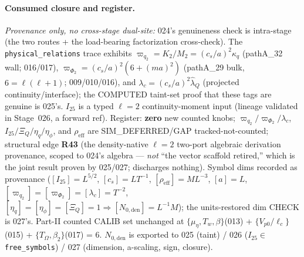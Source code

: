 \paragraph{Consumed closure and register.}
\emph{Provenance only, no cross-stage dual-site:} 024's genuineness check is intra-stage (the two
routes + the load-bearing factorization cross-check). The \texttt{physical\_relations} trace
exhibits \(\varpi_{q_2}=K_2/M_2=(c_s/a)^2\kappa_q\) (pathA\_32 wall; 016/017), \(\varpi_{\Phi_2}=(c_s/a)^2(6+(ma)^2)\)
(pathA\_29 bulk, \(6=\ell(\ell+1)\); 009/010/016), and \(\lambda_c=(c_s/a)^2\hat\lambda_Q\) (projected
continuity/interface); the COMPUTED taint-set proof that these tags are genuine is 025's. \(I_{25}\)
is a typed \(\ell=2\) continuity-moment input (lineage validated in Stage~026, a forward ref).
Register: \textbf{zero} new counted knobs; \(\varpi_{q_2}/\varpi_{\Phi_2}/\lambda_c\),
\(I_{25}/\Xi_Q/\eta_q/\eta_\phi\), and \(\rho_{\mathrm{eff}}\) are SIM\_DEFERRED/GAP tracked-not-counted;
structural edge \textbf{R43} (the density-native \(\ell=2\) two-port algebraic derivation provenance,
scoped to 024's algebra --- \emph{not} ``the vector scaffold retired,'' which is the joint result
proven by 025/027; discharges nothing). Symbol dims recorded as provenance
(\([I_{25}]=L^{5/2}\), \([c_s]=LT^{-1}\), \([\rho_{\mathrm{eff}}]=ML^{-3}\), \([a]=L\),
\([\varpi_{q_2}]=[\varpi_{\Phi_2}]=[\lambda_c]=T^{-2}\), \([\eta_q]=[\eta_\phi]=[\Xi_Q]=1\Rightarrow
[N_{0,\mathrm{den}}]=L^{-1}M\)); the units-restored dim CHECK is 027's. Part-II counted CALIB set
unchanged at \(\{\mu_\eta,T_w,\beta\}\)(013) + \(\{V_{p0}/\ell_c\}\)(015) + \(\{T_\Omega,\beta_2\}\)(017)
= 6. \(N_{0,\mathrm{den}}\) is exported to 025 (taint) / 026 (\(I_{25}\in\)\texttt{free\_symbols}) /
027 (dimension, a-scaling, sign, closure).

